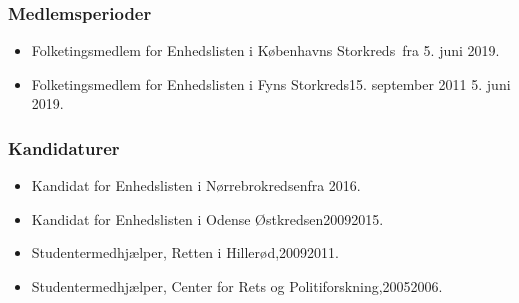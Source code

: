 \documentclass[11pt, a4paper]{awesome-cv}
\begin{document}
\begin{cvletter}
\subsubsection*{Medlemsperioder}
\begin{itemize}
\item Folketingsmedlem for Enhedslisten i Københavns Storkreds fra 5. juni 2019.
\item Folketingsmedlem for Enhedslisten i Fyns Storkreds15. september 2011  5. juni 2019.
\end{itemize}
\subsubsection*{Kandidaturer}
\begin{itemize}
\item Kandidat for Enhedslisten i Nørrebrokredsenfra 2016.
\item Kandidat for Enhedslisten i Odense Østkredsen20092015.
\end{itemize}
\begin{itemize}
\item Studentermedhjælper, Retten i Hillerød,20092011.
\item Studentermedhjælper, Center for Rets og Politiforskning,20052006.
\end{itemize}
\end{cvletter}
\end{document}
